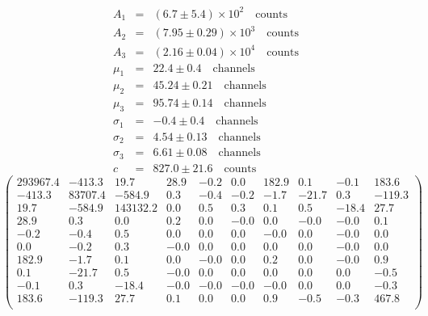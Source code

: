 \begin{align*}
    A_1 &=& \left(6.7 \pm 5.4\right) \times 10^{2} \quad \mathrm{counts}\\
    A_2 &=& \left(7.95 \pm 0.29\right) \times 10^{3} \quad\mathrm{counts}\\
    A_3 &=& \left(2.16 \pm 0.04\right) \times 10^{4} \quad\mathrm{counts}\\
    \mu_1 &=& 22.4 \pm 0.4 \quad\mathrm{channels}\\
    \mu_2 &=& 45.24 \pm 0.21 \quad\mathrm{channels}\\
    \mu_3 &=& 95.74 \pm 0.14 \quad\mathrm{channels}\\
    \sigma_1 &=& -0.4 \pm 0.4 \quad\mathrm{channels}\\
    \sigma_2 &=& 4.54 \pm 0.13 \quad\mathrm{channels}\\
    \sigma_3 &=& 6.61 \pm 0.08 \quad\mathrm{channels}\\
    c &=& 827.0 \pm 21.6\quad \mathrm{counts}
\end{align*}
\small
\begin{equation*}
    \begin{pmatrix}
        293967.4 &-413.3 &19.7 &28.9 &-0.2 &0.0 &182.9 &0.1 &-0.1 &183.6 \\
        -413.3 &83707.4 &-584.9 &0.3 &-0.4 &-0.2 &-1.7 &-21.7 &0.3 &-119.3 \\
        19.7 &-584.9 &143132.2 &0.0 &0.5 &0.3 &0.1 &0.5 &-18.4 &27.7 \\
        28.9 &0.3 &0.0 &0.2 &0.0 &-0.0 &0.0 &-0.0 &-0.0 &0.1 \\
        -0.2 &-0.4 &0.5 &0.0 &0.0 &0.0 &-0.0 &0.0 &-0.0 &0.0 \\
        0.0 &-0.2 &0.3 &-0.0 &0.0 &0.0 &0.0 &0.0 &-0.0 &0.0 \\
        182.9 &-1.7 &0.1 &0.0 &-0.0 &0.0 &0.2 &0.0 &-0.0 &0.9 \\
        0.1 &-21.7 &0.5 &-0.0 &0.0 &0.0 &0.0 &0.0 &0.0 &-0.5 \\
        -0.1 &0.3 &-18.4 &-0.0 &-0.0 &-0.0 &-0.0 &0.0 &0.0 &-0.3 \\
        183.6 &-119.3 &27.7 &0.1 &0.0 &0.0 &0.9 &-0.5 &-0.3 &467.8 \\
    \end{pmatrix}
\end{equation*}

   \normalsize
